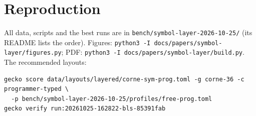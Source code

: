 \documentclass{gecko-paper}
\begin{document}
{\section{Reproduction}

All data, scripts and the best runs are in \texttt{bench/symbol-layer-2026-10-25/} (its README lists the order). Figures: \texttt{python3\ -I\ docs/papers/symbol-layer/figures.py}; PDF: \texttt{python3\ -I\ docs/papers/symbol-layer/build.py}. The recommended layouts:

\begin{verbatim}
gecko score data/layouts/layered/corne-sym-prog.toml -g corne-36 -c programmer-typed \
  -p bench/symbol-layer-2026-10-25/profiles/free-prog.toml
gecko verify run:20261025-162822-bls-85391fab
\end{verbatim}

}
\end{document}
